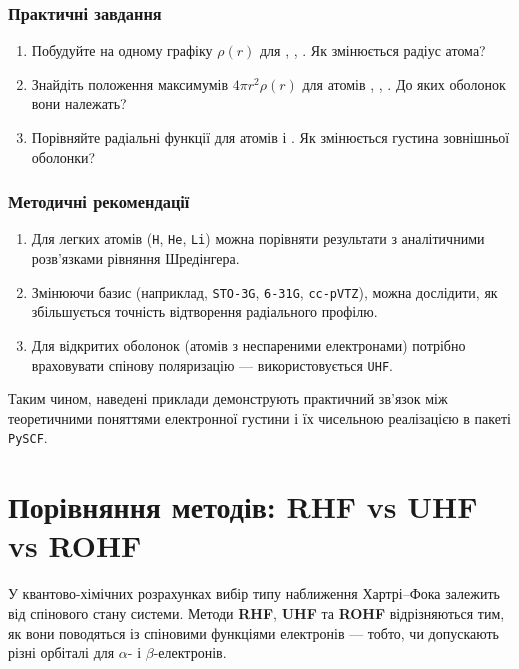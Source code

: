 \subsubsection{Практичні завдання}

\begin{enumerate}
    \item Побудуйте на одному графіку $\rho(r)$ для , , . Як змінюється радіус атома?
    \item Знайдіть положення максимумів $4\pi r^2\rho(r)$ для атомів , , . До яких оболонок вони належать?
    \item Порівняйте радіальні функції для атомів  і . Як змінюється густина зовнішньої оболонки?
\end{enumerate}


\subsubsection{Методичні рекомендації}

\begin{enumerate}
    \item Для легких атомів (\texttt{H}, \texttt{He}, \texttt{Li}) можна порівняти результати з аналітичними розв’язками рівняння Шредінгера.
    \item Змінюючи базис (наприклад, \texttt{STO-3G}, \texttt{6-31G}, \texttt{cc-pVTZ}), можна дослідити, як збільшується точність відтворення радіального профілю.
    \item Для відкритих оболонок (атомів з неспареними електронами) потрібно враховувати спінову поляризацію --- використовується \texttt{UHF}.
\end{enumerate}

Таким чином, наведені приклади демонструють практичний зв’язок між теоретичними поняттями електронної густини і їх чисельною реалізацією в пакеті \texttt{PySCF}.


\section{Порівняння методів: RHF vs UHF vs ROHF}

У квантово-хімічних розрахунках вибір типу наближення Хартрі–Фока залежить від спінового стану системи.
Методи \textbf{RHF}, \textbf{UHF} та \textbf{ROHF} відрізняються тим, як вони поводяться із спіновими функціями електронів --- тобто, чи допускають різні орбіталі для $\alpha$- і $\beta$-електронів.

